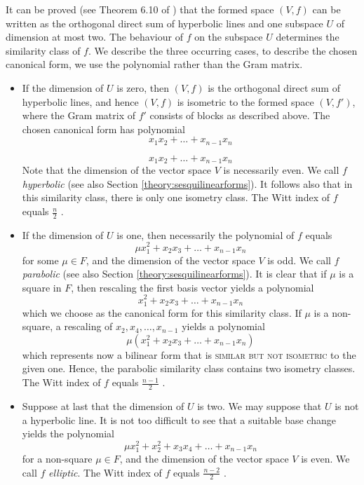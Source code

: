 \documentclass[a4paper,11pt]{report}
\begin{document}
{{{ It can be proved (see Theorem 6.10 of \cite{Cameron}) that the formed space $(V,f)$ can be written as the orthogonal direct sum of hyperbolic lines and one
subspace $U$ of dimension at most two. The behaviour of $f$ on the subspace $U$ determines the similarity class of $f$. We describe the three occurring cases, to describe the chosen canonical
form, we use the polynomial rather than the Gram matrix. 

 
\begin{itemize}
\item If the dimension of $U$ is zero, then $(V,f)$ is the orthogonal direct sum of hyperbolic lines, and hence $(V,f)$ is isometric to the formed space $(V,f')$, where the Gram matrix of $f'$ consists of blocks as described above. The chosen canonical form has
polynomial  
\[
x_1 x_2 + \ldots + x_{n-1}x_n
\]
  
\[x_1 x_2 + \ldots + x_{n-1}x_n\]
   Note that the dimension of the vector space $V$ is necessarily even. We call $f$ \emph{hyperbolic} (see also Section \ref{theory:sesquilinearforms}). It follows also that in this similarity class, there is only one isometry
class. The Witt index of $f$ equals  $\frac{n}{2}$ . 
\item If the dimension of $U$ is one, then necessarily the polynomial of $f$ equals  
\[\mu x_1^2 + x_2 x_3 + \ldots + x_{n-1}x_n\]
   for some $\mu \in F$, and the dimension of the vector space $V$ is odd. We call $f$ \emph{parabolic} (see also Section \ref{theory:sesquilinearforms}). It is clear that if $\mu$ is a square in $F$, then rescaling the first basis vector yields a polynomial  
\[x_1^2 + x_2 x_3 + \ldots + x_{n-1}x_n\]
   which we choose as the canonical form for this similarity class. If $\mu$ is a non-square, a rescaling of  $x_2,x_4,\ldots,x_{n-1}$   yields a polynomial  
\[\mu (x_1^2 + x_2 x_3 + \ldots + x_{n-1}x_n)\]
   which represents now a bilinear form that is \textsc{similar but not isometric} to the given one. Hence, the parabolic similarity class contains two isometry
classes. The Witt index of $f$ equals  $\frac{n-1}{2}$ . 
\item  Suppose at last that the dimension of $U$ is two. We may suppose that $U$ is not a hyperbolic line. It is not too difficult to see that a suitable base
change yields the polynomial  
\[\mu x_1^2 + x_2^2 + x_3 x_4 + \ldots + x_{n-1}x_n\]
   for a non-square $\mu \in F$, and the dimension of the vector space $V$ is even. We call $f$ \emph{elliptic}. The Witt index of $f$ equals  $\frac{n-2}{2}$ . 
\end{itemize}
 }

}}
\end{document}
